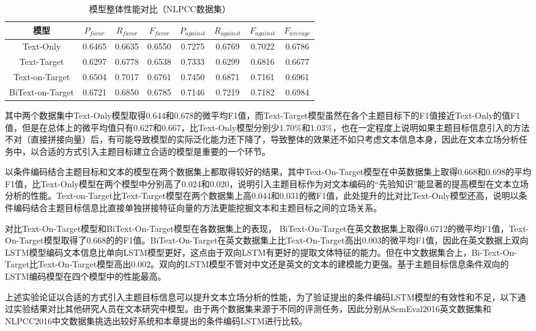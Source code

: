 \begin{table}[htbp]
	\caption[table123]{模型整体性能对比（NLPCC数据集）}
	\label{semeval_all_model}
	\vspace{0.5em}\centering\wuhao
	\begin{tabular}{cccccccc}
		\toprule[1.5pt]
		模型& $P_{favor}$&$R_{favor}$&$F_{favor}$&$P_{against}$&$R_{against}$&$F_{against}$&$F_{average}$ \\
		\midrule[1pt]
		Text-Only&0.6465&0.6635&0.6550&0.7275&0.6769&0.7022&0.6786\\
		Text-Target&0.6297&0.6778&0.6538&0.7333&0.6299&0.6816&0.6677\\
		Text-on-Target&0.6504&0.7017&0.6761&0.7450&0.6871&0.7161&0.6961\\
		BiText-on-Target&0.6721&0.6850&0.6785&0.7146&0.7219&0.7182&0.6984\\
		\bottomrule[1.5pt]
	\end{tabular}
\end{table}

其中两个数据集中Text-Only模型取得0.644和0.678的微平均F1值，而Text-Target模型虽然在各个主题目标下的F1值接近Text-Only的值F1值，但是在总体上的微平均值只有0.627和0.667，比Text-Only模型分别少1.70\%和1.03\%，也在一定程度上说明如果主题目标信息引入的方法不对（直接拼接向量）后，有可能导致模型的实际泛化能力还下降了，导致整体的效果还不如只考虑文本信息本身，因此在文本立场分析任务中，以合适的方式引入主题目标建立合适的模型是重要的一个环节。

以条件编码结合主题目标和文本的模型在两个数据集上都取得较好的结果，其中Text-On-Target模型在中英数据集上取得0.668和0.698的平均F1值，比Text-Only模型在两个模型中分别高了0.024和0.020，说明引入主题目标作为对文本编码的“先验知识”能显著的提高模型在文本立场分析的性能。Text-on-Target比Text-Target模型在两个数据集上高0.044和0.031的微F1值，此处提升的比对比Text-Only模型还高，说明以条件编码结合主题目标信息比直接单独拼接特征向量的方法更能挖掘文本和主题目标之间的立场关系。

对比Text-On-Target模型和BiText-On-Target模型在各数据集上的表现， BiText-On-Target在英文数据集上取得0.6712的微平均F1值，Text-On-Target模型取得了0.668的的F1值。BiText-On-Target在英文数据集上比Text-On-Target高出0.003的微平均F1值，因此在英文数据上双向LSTM模型编码文本信息比单向LSTM模型更好，这点由于双向LSTM有更好的提取文体特征的能力。但在中文数据集合上，Bi-Text-On-Target比Text-On-Target模型高出0.002。双向的LSTM模型不管对中文还是英文的文本的建模能力更强。基于主题目标信息条件双向的LSTM编码模型在四个模型中的性能最高。

上述实验论证以合适的方式引入主题目标信息可以提升文本立场分析的性能，为了验证提出的条件编码LSTM模型的有效性和不足，以下通过实验结果对比其他研究人员在文本研究中模型。由于两个数据集来源于不同的评测任务，因此分别从SemEval2016英文数据集和NLPCC2016中文数据集挑选出较好系统和本章提出的条件编码LSTM进行比较。

